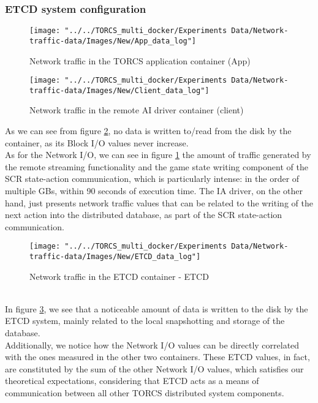 \subsubsection{ETCD system configuration}
\begin{figure}[h!]
	\centering
	\texttt{[image: "../../TORCS\_multi\_docker/Experiments Data/Network-traffic-data/Images/New/App\_data\_log"]}
	\caption[Network traffic in the TORCS application container - ETCD]{Network traffic in the TORCS application container (App)}
	\label{fig:appdatalog}
\end{figure}
\begin{figure}[h!]
	\centering
	\texttt{[image: "../../TORCS\_multi\_docker/Experiments Data/Network-traffic-data/Images/New/Client\_data\_log"]}
	\caption[Network traffic in the remote AI driver container - ETCD]{Network traffic in the remote AI driver container (client)}
	\label{fig:clientdatalog}
\end{figure}
As we can see from figure \ref{fig:clientdatalog}, no data is written to/read from the disk by the container, as its Block I/O values never increase. \\
As for the Network I/O, we can see in figure \ref{fig:appdatalog} the amount of traffic generated by the remote streaming functionality and the game state writing component of the SCR state-action communication, which is particularly intense: in the order of multiple GBs, within 90 seconds of execution time. The IA driver, on the other hand, just presents network traffic values that can be related to the writing of the next action into the distributed database, as part of the SCR state-action communication.
\begin{figure}[h!]
	\centering
	\texttt{[image: "../../TORCS\_multi\_docker/Experiments Data/Network-traffic-data/Images/New/ETCD\_data\_log"]}
	\caption[Network traffic in the ETCD container]{Network traffic in the ETCD container - ETCD}
	\label{fig:etcddatalog}
\end{figure}
\\ In figure \ref{fig:etcddatalog}, we see that a noticeable amount of data is written to the disk by the ETCD system, mainly related to the local snapshotting and storage of the database. \\
Additionally, we notice how the Network I/O values can be directly correlated with the ones measured in the other two containers. These ETCD values, in fact, are constituted by the sum of the other Network I/O values, which satisfies our theoretical expectations, considering that ETCD acts as a means of communication between all other TORCS distributed system components.

